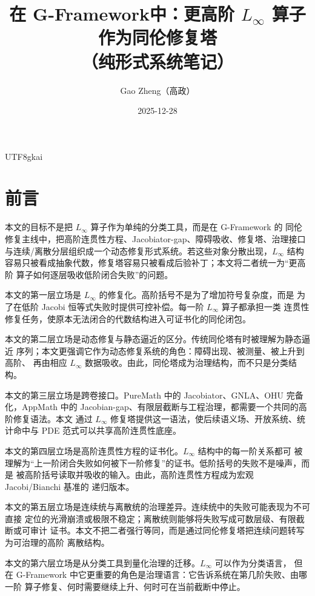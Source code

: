 \documentclass[12pt]{article}
\newcommand{\GFramework}{\textsf{G-Framework}}
\begin{document}
\begin{CJK*}{UTF8}{gkai}

\title{在 \GFramework 中：更高阶 $L_\infty$ 算子作为同伦修复塔\\（纯形式系统笔记）}
\newcommand{\CertificateAuthorCN}{Gao Zheng（高政）}
\author{\CertificateAuthorCN}
\date{2025-12-28}
\maketitle

\section*{前言}

本文的目标不是把 \(L_\infty\) 算子作为单纯的分类工具，而是在 \GFramework{} 的
同伦修复主线中，把高阶连贯性方程、Jacobiator-gap、障碍吸收、修复塔、治理接口
与连续/离散分层组织成一个动态修复形式系统。若这些对象分散出现，\(L_\infty\)
结构容易只被看成抽象代数，修复塔容易只被看成后验补丁；本文将二者统一为“更高阶
算子如何逐层吸收低阶闭合失败”的问题。

本文的第一层立场是 \(L_\infty\) 的修复化。高阶括号不是为了增加符号复杂度，而是
为了在低阶 Jacobi 恒等式失败时提供可控补偿。每一阶 \(L_\infty\) 算子都承担一类
连贯性修复任务，使原本无法闭合的代数结构进入可证书化的同伦闭包。

本文的第二层立场是动态修复与静态逼近的区分。传统同伦塔有时被理解为静态逼近
序列；本文更强调它作为动态修复系统的角色：障碍出现、被测量、被上升到高阶、
再由相应 \(L_\infty\) 数据吸收。由此，同伦塔成为治理结构，而不只是分类结构。

本文的第三层立场是跨卷接口。PureMath 中的 Jacobiator、GNLA、OHU 完备化，AppMath
中的 Jacobian-gap、有限层截断与工程治理，都需要一个共同的高阶修复语法。本文
通过 \(L_\infty\) 修复塔提供这一语法，使后续语义场、开放系统、统计命中与 PDE
范式可以共享高阶连贯性底座。

本文的第四层立场是高阶连贯性方程的证书化。\(L_\infty\) 结构中的每一阶关系都可
被理解为“上一阶闭合失败如何被下一阶修复”的证书。低阶括号的失败不是噪声，而是
被高阶括号读取并吸收的输入。由此，高阶连贯性方程成为宏观 Jacobi/Bianchi 基准的
递归版本。

本文的第五层立场是连续统与离散统的治理差异。连续统中的失败可能表现为不可直接
定位的光滑崩溃或极限不稳定；离散统则能够将失败写成可数层级、有限截断或可审计
证书。本文不把二者强行等同，而是通过同伦修复塔把连续问题转写为可治理的高阶
离散结构。

本文的第六层立场是从分类工具到量化治理的迁移。\(L_\infty\) 可以作为分类语言，
但在 G-Framework 中它更重要的角色是治理语言：它告诉系统在第几阶失败、由哪一阶
算子修复、何时需要继续上升、何时可在当前截断中停止。


\end{CJK*}
\end{document}
